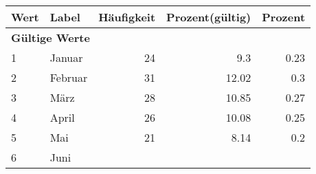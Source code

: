      \begin{longtable}{lXrrr}
     \toprule
     \textbf{Wert} & \textbf{Label} & \textbf{Häufigkeit} & \textbf{Prozent(gültig)} & \textbf{Prozent} \\
     \endhead
     \midrule
     \multicolumn{5}{l}{\textbf{Gültige Werte}}\\

     1 &
     \multicolumn{1}{X}{ Januar   } &


       \num{24} &
       \num[round-mode=places,round-precision=2]{9.3} &
         \num[round-mode=places,round-precision=2]{0.23} \\

     2 &
     \multicolumn{1}{X}{ Februar   } &


       \num{31} &
       \num[round-mode=places,round-precision=2]{12.02} &
         \num[round-mode=places,round-precision=2]{0.3} \\

     3 &
     \multicolumn{1}{X}{ März   } &


       \num{28} &
       \num[round-mode=places,round-precision=2]{10.85} &
         \num[round-mode=places,round-precision=2]{0.27} \\

     4 &
     \multicolumn{1}{X}{ April   } &


       \num{26} &
       \num[round-mode=places,round-precision=2]{10.08} &
         \num[round-mode=places,round-precision=2]{0.25} \\

     5 &
     \multicolumn{1}{X}{ Mai   } &


       \num{21} &
       \num[round-mode=places,round-precision=2]{8.14} &
         \num[round-mode=places,round-precision=2]{0.2} \\

     6 &
     \multicolumn{1}{X}{ Juni   } &



\end{longtable}
